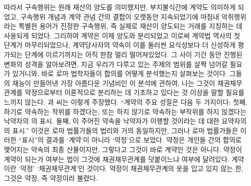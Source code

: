 따라서 구속행위는 원래 재산의 양도를 의미했지만,
부지불식간에 계약도 의미하게 되었고,
구속행위 개념과 계약 관념 간의 결합이 오랫동안 지속되었기에
마침내
악취행위라는 특별한 용어가
진정한 구속행위, 즉 실제로 재산이 양도되는 거래를 지칭하는 데
사용되게 되었다.
그리하여 계약은 이제 양도와 분리되었고
이로써 계약법 역사의 첫 단계가 마무리되었으나,
계약당사자의 약속이 이를 둘러싼 요식성보다 더 신성하게 평가되는
단계에 이르기까지는 아직 한참 멀리 떨어져있었다.
그 사이 기간 동안 진행된 변화의 성격을 알아보려면,
지금 우리가 다루고 있는 주제의 범위를 살짝 넘어갈 필요가 있거니와,
바로 로마 법학자들이 합의를 어떻게 분석했는지
살펴보는 것이다.
그들의 재능이 만들어낸 가장 아름다운 기념비인
이 분석에 관하여, 나는
그것이 채권채무관계를 약정으로부터
이론적으로 분리하는 데 기초하고 있다는 것 이상을 말할
필요를 느끼지 않는다.
과  씨는 이렇게 주장했다.
``계약의 주요 성질은 다음 두 가지이다:
첫째,
하기로 약속하는 작위를 하겠다는,
또는
하지 않기로 약속하는 부작위를 하지 않겠다는
낙약자의
의 표시.
둘째,
이 주어진 약속을 낙약자가 이행할 것이라는 데 대한
요약자의
의 표시.''
이것은
로마 법률가들의 법리와 거의 동일하지만,
그러나 로마 법률가들은
이러한 ``표시''의 결과를 `계약'이 아니라
`약정'으로 보았다.
약정은 개인들 간의 합의로 맺어지는 약속의 최종 산물이지만,
그렇다고 그것이 바로 계약인 것은 아니다.
약정이 계약이 되는가 여부는
법이 그것에 채권채무관계를 덧붙이느냐 여부에 달려있다.
계약이란 `약정'  `채권채무관계'인 것이다.
약정이 채권채무관계의 옷을 입고 있지 않는 한,
그것은 약정, 즉  약정이라 불렸다.

